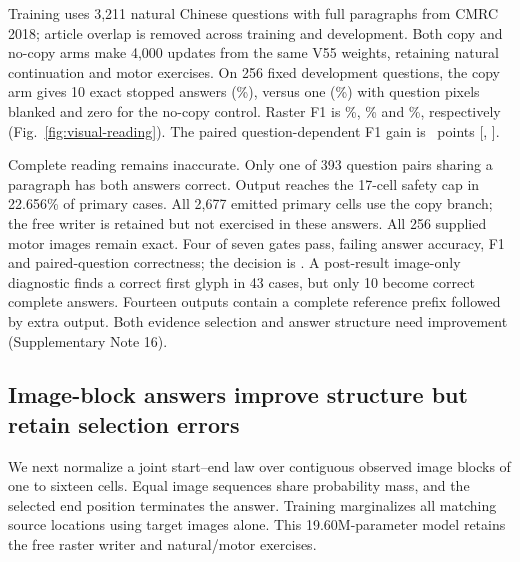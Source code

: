 Training uses 3,211 natural Chinese questions with full paragraphs from
CMRC 2018\cite{cmrc}; article overlap is removed across training and development.
Both copy and no-copy arms make 4,000 updates from the same V55 weights,
retaining natural continuation and motor exercises. On 256 fixed development
questions, the copy arm gives 10 exact stopped answers (\QaExact\%), versus
one (\QaBlankExact\%) with question pixels blanked and zero for the no-copy
control. Raster F1 is \QaFone\%, \QaBlankFone\% and \QaControlFone\%,
respectively (Fig.~\ref{fig:visual-reading}). The paired question-dependent
F1 gain is \QaQuestionGain\ points [\QaQuestionLow, \QaQuestionHigh].

Complete reading remains inaccurate. Only one of 393 question pairs sharing
a paragraph has both answers correct. Output reaches the 17-cell safety cap
in 22.656\% of primary cases. All 2,677 emitted primary cells use the copy
branch; the free writer is retained but not exercised in these answers.
All 256 supplied motor images remain exact. Four of seven gates pass, failing
answer accuracy, F1 and paired-question correctness; the decision is
\texttt{\QaDecision}. A post-result image-only diagnostic finds a correct
first glyph in 43 cases, but only 10 become correct complete answers. Fourteen
outputs contain a complete reference prefix followed by extra output. Both
evidence selection and answer structure need improvement (Supplementary Note 16).


\subsection*{Image-block answers improve structure but retain selection errors}
We next normalize a joint start--end law over contiguous observed image
blocks of one to sixteen cells. Equal image sequences share probability mass,
and the selected end position terminates the answer. Training marginalizes
all matching source locations using target images alone. This 19.60M-parameter
model retains the free raster writer and natural/motor exercises.

